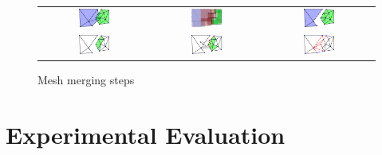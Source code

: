 \begin{figure}[t]
\begin{tabular}{ccc}
\includegraphics[width=0.3\textwidth]{./img/ch-incr-dens/meshmerge01}&
\includegraphics[width=0.3\textwidth]{./img/ch-incr-dens/meshmerge03}&
\includegraphics[width=0.3\textwidth]{./img/ch-incr-dens/meshmerge04}\\
\includegraphics[width=0.3\textwidth]{./img/ch-incr-dens/meshmerge07}&
\includegraphics[width=0.3\textwidth]{./img/ch-incr-dens/meshmerge09}&
\includegraphics[width=0.3\textwidth]{./img/ch-incr-dens/meshmerge11}
\end{tabular}
\label{fig:mesh_merging}
\caption{Mesh merging steps}
\end{figure}



\section{Experimental Evaluation}
\label{sec:exp}

